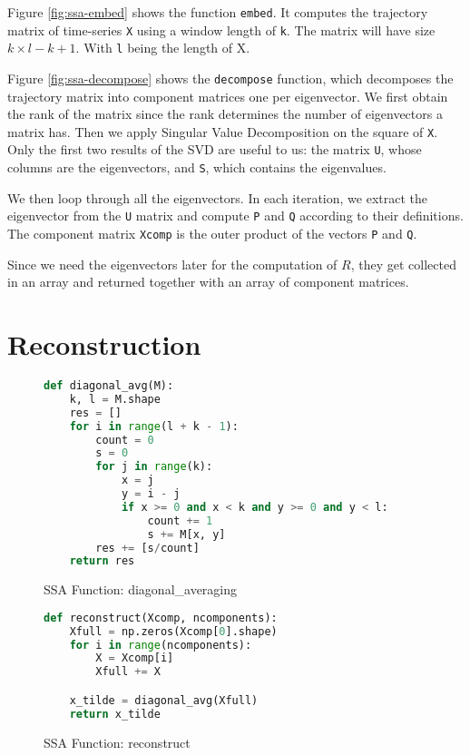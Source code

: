 Figure \ref{fig:ssa-embed} shows the function \texttt{embed}. It computes the trajectory matrix of time-series \texttt{X} using a window length of \texttt{k}. The matrix will have size $k \times l-k+1$. With \texttt{l} being the length of X. 

Figure \ref{fig:ssa-decompose} shows the \texttt{decompose} function, which decomposes the trajectory matrix into component matrices one per eigenvector.  We first obtain the rank of the matrix since the rank determines the number of eigenvectors a matrix has. Then we apply Singular Value Decomposition on the square of \texttt{X}. Only the first two results of the SVD are useful to us: the matrix \texttt{U}, whose columns are the eigenvectors, and \texttt{S}, which contains the eigenvalues. 

We then loop through all the eigenvectors. In each iteration, we extract the eigenvector from the \texttt{U} matrix and compute \texttt{P} and \texttt{Q} according to their definitions. The component matrix \texttt{Xcomp} is the outer product of the vectors \texttt{P} and \texttt{Q}. 

Since we need the eigenvectors later for the computation of $R$, they get collected in an array and returned together with an array of component matrices. 

\section{Reconstruction}

\begin{figure}
\begin{singlespace}
\begin{lstlisting}[language=Python]
def diagonal_avg(M):
    k, l = M.shape
    res = []
    for i in range(l + k - 1):
        count = 0
        s = 0
        for j in range(k):
            x = j
            y = i - j
            if x >= 0 and x < k and y >= 0 and y < l:
                count += 1
                s += M[x, y]
        res += [s/count]
    return res
\end{lstlisting}
\end{singlespace}
\caption{SSA Function: diagonal\_averaging}    
\label{fig:ssa-diag-avg}
\end{figure}

\begin{figure}
\begin{singlespace}
\begin{lstlisting}[language=Python]
def reconstruct(Xcomp, ncomponents):
    Xfull = np.zeros(Xcomp[0].shape)
    for i in range(ncomponents):
        X = Xcomp[i]
        Xfull += X

    x_tilde = diagonal_avg(Xfull)
    return x_tilde
\end{lstlisting}
\end{singlespace}
\caption{SSA Function: reconstruct}    
\label{fig:ssa-reconstruct}
\end{figure}

